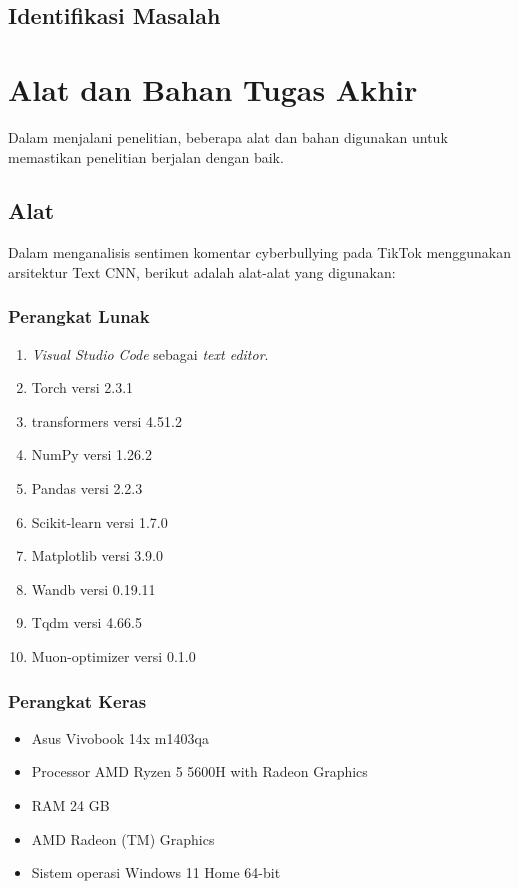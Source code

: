 \subsection{Identifikasi Masalah} \label{III.Identifikasi_masalah}


\section{Alat dan Bahan Tugas Akhir} \label{III.Alat dan Bahan}
Dalam menjalani penelitian, beberapa alat dan bahan digunakan untuk memastikan penelitian berjalan dengan baik.\par

\subsection{Alat} \label{III.Alat}
Dalam menganalisis sentimen komentar cyberbullying pada TikTok menggunakan arsitektur Text CNN, berikut adalah alat-alat yang digunakan: \par

\subsubsection{Perangkat Lunak}
\begin{enumerate}[noitemsep]
    \item \textit{Visual Studio Code} sebagai \textit{text editor}.
    \item Torch versi 2.3.1
    \item transformers versi 4.51.2
    \item NumPy versi 1.26.2
    \item Pandas versi 2.2.3
    \item Scikit-learn versi 1.7.0
    \item Matplotlib versi 3.9.0
    \item Wandb versi 0.19.11
    \item Tqdm versi 4.66.5
    \item Muon-optimizer versi 0.1.0
\end{enumerate}

\subsubsection{Perangkat Keras}
\begin{itemize}[noitemsep]
	\item Asus Vivobook 14x m1403qa
    \item Processor AMD Ryzen 5 5600H with Radeon Graphics    
    \item RAM 24 GB
    \item AMD Radeon (TM) Graphics
    \item Sistem operasi Windows 11 Home 64-bit
\end{itemize}

